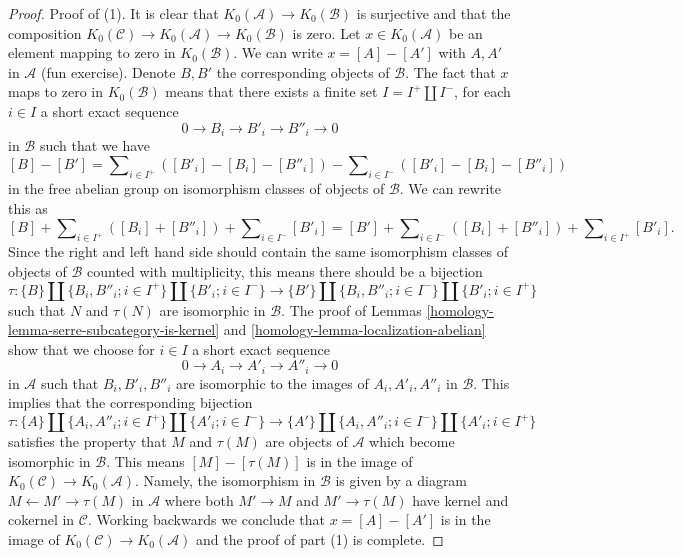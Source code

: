 \begin{proof}

Proof of (1). It is clear that $K_0(\mathcal{A}) \to K_0(\mathcal{B})$
is surjective and that the composition $K_0(\mathcal{C}) \to
K_0(\mathcal{A}) \to K_0(\mathcal{B})$ is zero. Let $x \in K_0(\mathcal{A})$
be an element mapping to zero in $K_0(\mathcal{B})$. We can write
$x = [A] - [A']$ with $A, A'$ in $\mathcal{A}$ (fun exercise).
Denote $B, B'$ the corresponding objects of $\mathcal{B}$. The fact that
$x$ maps to zero in $K_0(\mathcal{B})$
means that there exists a finite set $I = I^+ \amalg I^{-}$,
for each $i \in I$ a short exact sequence
$$
0 \to B_i \to B'_i \to B''_i \to 0
$$
in $\mathcal{B}$ such that we have
$$
[B] - [B'] = \sum\nolimits_{i \in I^{+}} ([B'_i] - [B_i] - [B''_i])
-
\sum\nolimits_{i \in I^{-}} ([B'_i] - [B_i] - [B''_i])
$$
in the free abelian group on isomorphism classes of objects of $\mathcal{B}$.
We can rewrite this as
$$
[B]
+ \sum\nolimits_{i \in I^{+}} ([B_i] + [B''_i])
+ \sum\nolimits_{i \in I^{-}} [B'_i]
=
[B']
+ \sum\nolimits_{i \in I^{-}} ([B_i] + [B''_i])
+ \sum\nolimits_{i \in I^{+}} [B'_i].
$$
Since the right and left hand side should contain the same isomorphism classes
of objects of $\mathcal{B}$ counted with multiplicity, this means there should
be a bijection
$$
\tau :
\{B\} \amalg \{B_i, B''_i; i \in I^+\} \amalg \{B'_i; i \in I^-\}
\longrightarrow
\{B'\} \amalg \{B_i, B''_i; i \in I^-\} \amalg \{B'_i; i \in I^+\}
$$
such that $N$ and $\tau(N)$ are isomorphic in $\mathcal{B}$.
The proof of Lemmas \ref{homology-lemma-serre-subcategory-is-kernel} and
\ref{homology-lemma-localization-abelian} show that we choose for $i \in I$
a short exact sequence
$$
0 \to A_i \to A'_i \to A''_i \to 0
$$
in $\mathcal{A}$ such that $B_i, B'_i, B''_i$ are isomorphic to the
images of $A_i, A'_i, A''_i$ in $\mathcal{B}$. This implies that the
corresponding bijection
$$
\tau :
\{A\} \amalg \{A_i, A''_i; i \in I^+\} \amalg \{A'_i; i \in I^-\}
\longrightarrow
\{A'\} \amalg \{A_i, A''_i; i \in I^-\} \amalg \{A'_i; i \in I^+\}
$$
satisfies the property that $M$ and $\tau(M)$ are objects of $\mathcal{A}$
which become isomorphic in $\mathcal{B}$. This means $[M] - [\tau(M)]$
is in the image of $K_0(\mathcal{C}) \to K_0(\mathcal{A})$. Namely,
the isomorphism in $\mathcal{B}$ is given by a diagram
$M \leftarrow M' \rightarrow \tau(M)$ in $\mathcal{A}$ where both
$M' \to M$ and $M' \to \tau(M)$ have kernel and cokernel in $\mathcal{C}$.
Working backwards we conclude that $x = [A] - [A']$ is in the image
of $K_0(\mathcal{C}) \to K_0(\mathcal{A})$ and the proof of part (1)
is complete.


\end{proof}
